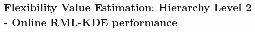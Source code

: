 

%







\subsection{Flexibility Value Estimation: Hierarchy Level 2 - Online RML-KDE performance}\label{Sect:ResultRMLalgorithm}

